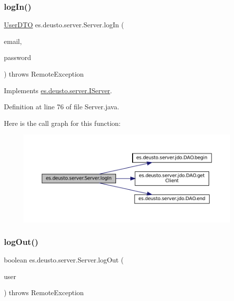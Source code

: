 \subsubsection{\texorpdfstring{logIn()}{logIn()}}
{\footnotesize\ttfamily \mbox{\hyperlink{classes_1_1deusto_1_1server_1_1data_1_1_user_d_t_o}{User\+D\+TO}} es.\+deusto.\+server.\+Server.\+log\+In (\begin{DoxyParamCaption}\item[{String}]{email,  }\item[{String}]{password }\end{DoxyParamCaption}) throws Remote\+Exception}



Implements \mbox{\hyperlink{interfacees_1_1deusto_1_1server_1_1_i_server_a62db155ac744b9712e303ceea76a3560}{es.\+deusto.\+server.\+I\+Server}}.



Definition at line 76 of file Server.\+java.

Here is the call graph for this function\+:
\nopagebreak
\begin{figure}[H]
\begin{center}
\leavevmode
\includegraphics[width=350pt]{classes_1_1deusto_1_1server_1_1_server_ab93f5cc9b5825192c31cd2088014378d_cgraph}
\end{center}
\end{figure}
\mbox{\label{classes_1_1deusto_1_1server_1_1_server_a92cf8a599adfa6a34f7cfe788119cf0a}} 
\subsubsection{\texorpdfstring{logOut()}{logOut()}}
{\footnotesize\ttfamily boolean es.\+deusto.\+server.\+Server.\+log\+Out (\begin{DoxyParamCaption}\item[{\mbox{\hyperlink{classes_1_1deusto_1_1server_1_1data_1_1_user_d_t_o}{User\+D\+TO}}}]{user }\end{DoxyParamCaption}) throws Remote\+Exception}



